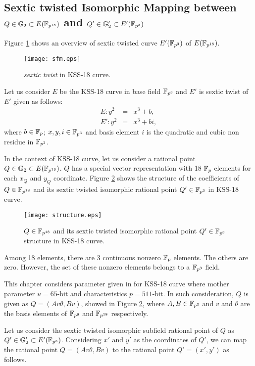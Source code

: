 \subsection{Sextic twisted Isomorphic Mapping between \texorpdfstring{$Q \in {\mathbb{G}}_{2} \subset E(\mathbb{F}_{p^{18}})$}{} and \texorpdfstring{$Q' \in {\mathbb{G}}_{2}' \subset E'(\mathbb{F}_{p^3})$}{}}
Figure \ref{fig:sextickss18_chap_ijnc2017} shows an overview of sextic twisted curve $E'(\mathbb{F}_{p^3})$ of $E(\mathbb{F}_{p^{18}})$.
\begin{figure*}
\centering
\texttt{[image: sfm.eps]}
\caption{\textit{sextic twist} in KSS-18 curve.}
\label{fig:sextickss18_chap_ijnc2017}
\end{figure*}

Let us consider $E$ be the KSS-18 curve in base field $\mathbb{F}_{p^3}$  and $E'$ is sextic twist of $E'$ given as follows: 
\begin{eqnarray}
E:y^2 & = &x^3+b,\\
E':y^2 & = & x^3+bi, \label{eq:KSS18_Twist_chap_ijnc2017}
\end{eqnarray}
where $b \in {\mathbb{F}}_{p}$; $x, y, i \in \mathbb{F}_{p^3}$ and basis element $i$ is the quadratic and cubic non residue in $\mathbb{F}_{p^3}$.

In the context of KSS-18 curve, let us consider a rational point $Q\in {\mathbb{G}}_{2} \subset E({\mathbb{F}}_{p^{18}})$.
$Q$ has a  special vector representation with 18 ${\mathbb{F}}_{p}$ elements for each $x_Q$ and $y_Q$ coordinate.
Figure \ref{fig:Q_structureKSS18_chap_ijnc2017} shows the structure of the coefficients of $Q \in \mathbb{F}_{p^{18}}$ and its sextic twisted isomorphic rational point $Q' \in \mathbb{F}_{p^3}$ in KSS-18 curve.
\begin{figure*}
\centering
\texttt{[image: structure.eps]}
\caption{ $Q \in \mathbb{F}_{p^{18}}$ and its sextic twisted isomorphic rational point $Q' \in \mathbb{F}_{p^3}$ structure in KSS-18 curve.}
\label{fig:Q_structureKSS18_chap_ijnc2017}
\end{figure*}
Among 18 elements, there are 3 continuous nonzero ${\mathbb{F}}_{p}$ elements. The others are zero.
However, the set of these nonzero elements belongs to a $\mathbb{F}_{p^3}$ field. 

This chapter considers parameter given in  for KSS-18 curve where mother parameter $u=65$-bit and characteristics $p=511$-bit. In such consideration, $Q$ is given as $Q = (Av\theta, Bv)$,  showed in Figure \ref{fig:Q_structureKSS18_chap_ijnc2017}, where $A, B \in \mathbb{F}_{p^3}$ and $v$ and $\theta$ are the basis elements of ${\mathbb{F}}_{p^{6}}$ and $\mathbb{F}_{p^{18}}$ respectively. 

Let us consider the sextic twisted isomorphic subfield rational point of $Q$ as $Q' \in {\mathbb{G}}_{2}' \subset E'({\mathbb{F}}_{p^{3}})$.
Considering $x'$ and $y'$ as the coordinates of $Q'$, we can map the rational point $Q = (Av\theta, Bv)$  to the rational point  $Q' = (x',y')$ as follows.

